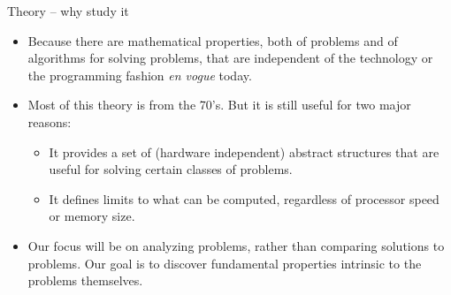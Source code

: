 \documentclass{prosper}%
\begin{document}
\begin{slide}{Theory -- why study it}
\begin{itemize}
\item  Because  there are mathematical properties, both of problems and of algorithms for solving problems, that are independent of the technology or the programming fashion {\em en vogue} today.

\item Most of this theory is from the 70's. But it is still useful for two major reasons:
\begin{itemize}
\item It provides a set of (hardware independent) {\blue abstract structures}  that are useful for solving certain classes of problems.
\item It defines limits to what can be computed, regardless of processor speed or memory size.
\end{itemize}
\item Our focus will be on analyzing problems, rather than comparing solutions to problems. Our goal is to discover fundamental properties intrinsic to the problems themselves.
\end{itemize}
\end{slide}

\begin{comment}
\begin{slide}{\large Automata, Formal Languages, and Computation}
\begin{itemize}
\item 1843: Charles Babbage \& Ada Lovelace, the Analytical Machine and the first ``Algorithm''.
\item 1930's: Turing aimed to describe where lies the boundary separating what could and could not be computed.
\item 40's: simpler machines ({\blue finite automata}) proposed to model brain function.
\item 50's: Noam Chomsky begins studying {\blue generative grammars} (they are not machines, but closely relate to finite automata). 
\item 1969: S. Cook extended Turing's study and defined where lies the line dividing   problems that  computers can  effectively solve and those that  computers would hopelessly take too much time to solve. 
\end{itemize}
\end{slide}
\end{comment}
\end{document}
